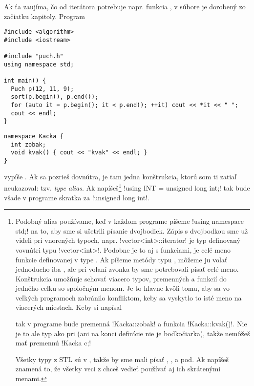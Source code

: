  Ak ťa zaujíma, čo od iterátora potrebuje napr. funkcia , v súbore
je dorobený  zo začiatku kapitoly. Program

\begin{lstlisting}
#include <algorithm>
#include <iostream>

#include "puch.h"
using namespace std;

int main() { 
  Puch p(12, 11, 9);
  sort(p.begin(), p.end()); 
  for (auto it = p.begin(); it < p.end(); ++it) cout << *it << " ";
  cout << endl;
} 
\end{lstlisting}


\begin{lrbox}{\TmpBox}
\begin{lstlisting}[basicstyle=\scriptsize\roboto]
namespace Kacka {
  int zobak;
  void kvak() { cout << "kvak" << endl; }
} 
\end{lstlisting}
\end{lrbox}


vypíše . Ak sa pozrieš dovnútra, je tam jedna konštrukcia, ktorú som ti zatiaľ
neukazoval: tzv. {\em type alias}. Ak napíšeš\footnote{
Podobný alias používame, keď v každom programe píšeme \prg!using namespace std;! na to, aby sme si ušetrili písanie dvojbodiek.
Zápis s dvojbodkou  sme už videli pri vnorených typoch, napr. \prg!vector<int>::iterator! je typ  definovaný vovnútri typu 
\prg!vector<int>!. Podobne je to aj s funkciami,  je celé meno funkcie  definovanej v type . Ak
píšeme metódy typu , môžeme ju volať jednoducho iba , ale pri volaní zvonka by sme potrebovali písať celé meno.
Konštrukcia  umožňuje schovať viacero typov, premenných a funkcií do jedného celku so spoločným menom. Je to hlavne kvôli tomu, aby 
sa vo veľkých programoch zabránilo konfliktom, keby sa vyskytlo to isté meno na viacerých miestach. Keby si napísal

\usebox{\TmpBox}

tak v programe bude premenná \prg!Kacka::zobak! a funkcia \prg!Kacka::kvak()!. Nie je to ale typ ako pri  (ani na konci definície nie je bodkočiarka),
takže nemôžeš mať premennú \prg!Kacka c;!

Všetky typy z STL sú v , takže by sme mali písať , ,  a pod. Ak napíšeš \hbox{} znamená to,
že všetky veci z  chceš vedieť používať aj ich skrátenými menami.
} \prg!using INT = unsigned long int;!
tak  bude všade v programe skratka za \prg!unsigned long int!. 

